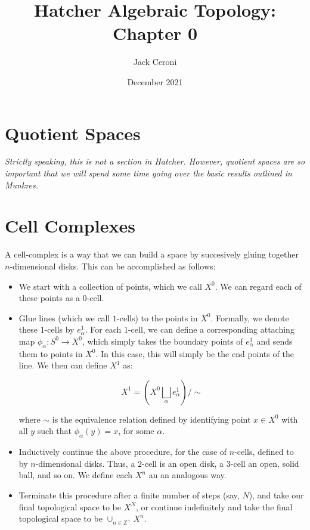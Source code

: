\documentclass[10pt, oneside]{amsart}
\title{Hatcher Algebraic Topology: Chapter 0}
\author{Jack Ceroni}
\date{December 2021}
\begin{document}
    \maketitle

    \tableofcontents

    \vspace{.25in}

    \newpage

    \hrulefill

    \section{Quotient Spaces}

    \textit{Strictly speaking, this is not a section in Hatcher. However, quotient spaces are so important that we will spend some time going over the basic results outlined in Munkres.}
    \newline

    

    \hrulefill

    \section{Cell Complexes}

    A cell-complex is a way that we can build a space by succesively gluing together $n$-dimensional disks. This can be accomplished as follows:

    \begin{itemize}
    \item We start with a collection of points, which we call $X^0$. We can regard each of these points as a $0$-cell.
    \item Glue lines (which we call $1$-cells) to the points in $X^0$.
      Formally, we denote these $1$-cells by $e^{1}_{\alpha}$. For each $1$-cell,
      we can define a corresponding attaching map $\phi_{\alpha} : S^{0} \rightarrow X^0$, which simply takes the boundary points of $e^{1}_{\alpha}$ and sends them to points in $X^0$.
      In this case, this will simply be the end points of the line. We then can define $X^1$ as:

      $$X^1 = \left( X^0 \displaystyle\bigsqcup_{\alpha} e^{1}_{\alpha} \right) / \sim$$

      \noindent
      where $\sim$ is the equivalence relation defined by identifying point $x \in X^0$ with all $y$ such that $\phi_{\alpha}(y) = x$, for some $\alpha$.
    \item Inductively continue the above procedure, for the case of $n$-cells, defined to by $n$-dimensional disks. Thus, a $2$-cell is an open disk, a $3$-cell an open, solid ball,
      and so on. We define each $X^n$ an an analogous way.
    \item Terminate this procedure after a finite number of steps (say, $N$), and take our final topological space to be $X^N$, or continue indefinitely and take the final topological
      space to be $\cup_{n \in \mathbb{Z}^{+}} X^{n}$.
    \end{itemize}
\end{document}
